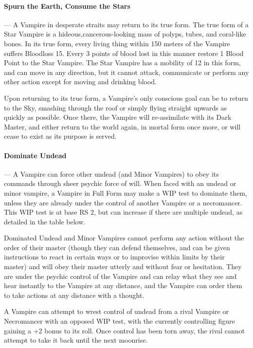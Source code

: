 \documentclass[oneside,11pt,english]{book}
\begin{document}
\paragraph{Spurn the Earth, Consume the Stars}---\quad
A Vampire in desperate straits may return to its true form. The true form of a Star Vampire is a 
hideous,cancerous-looking mass of polyps, tubes, and coral-like bones. In its true form, every 
living thing within 150 meters of the Vampire suffers Bloodloss 15. Every 3 points of blood lost in 
this manner restore 1 Blood Point to the Star Vampire. The Star Vampire has a mobility of 12 in 
this form, and can move in any direction, but it cannot attack, communicate or perform any other 
action except for moving and drinking blood. 

Upon returning to its true form, a Vampire's only conscious goal can be to return to the Sky, 
smashing through the roof or simply flying straight upwards as quickly as possible. Once there, 
the Vampire will re-assimilate with its Dark Master, and either return to the world again, in mortal 
form once more, or will cease to exist as its purpose is served. 

\paragraph{Dominate Undead}---\quad
A Vampire can force other undead (and Minor Vampires) to obey its commands through sheer 
psychic force of will. When faced with an undead or minor vampire, a Vampire in Full Form may 
make a WIP test to dominate them, unless they are already under the control of another 
Vampire or a necromancer.
This WIP test is at base RS 2, but can increase if there are multiple undead, as detailed in the 
table below. 

Dominated Undead and Minor Vampires cannot perform any action without the order of their 
master (though they can defend themselves, and can be given instructions to react in certain 
ways or to improvise within limits by their master) and will obey their master utterly and without 
fear or hesitation. They are under the psychic control of the Vampire and can relay what they 
see and hear instantly to the Vampire at any distance, and the Vampire can order them to take 
actions at any distance with a thought. 

A Vampire can attempt to wrest control of undead from a rival Vampire or Necromancer with an 
opposed WIP test, with the currently controlling figure gaining a +2 bonus to its roll. Once 
control has been torn away, the rival cannot attempt to take it back until the next moonrise. 
\end{document}
